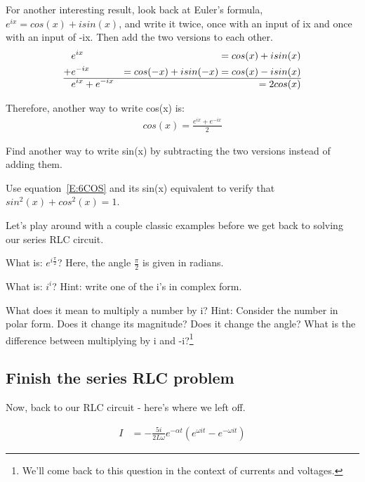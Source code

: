 For another interesting result, look back at Euler's formula, $e^{ix}=cos(x)+isin(x)$, and write it twice, once with an input of ix and once with an input of -ix. Then add the two versions to each other.
\begin{align}
&e^{ix}&=cos(x)+isin(x) \notag\\
+&e^{-ix}&=cos(-x)+isin(-x)=cos(x)-isin(x) \notag\\
\hline
&e^{ix}+e^{-ix}&=2cos(x)
\end{align}

Therefore, another way to write cos(x) is:
\begin{align}
cos(x)=\frac{e^{ix}+e^{-ix}}{2} \label{E:6COS}
\end{align}

\begin{clevel}
Find another way to write sin(x) by subtracting the two versions instead of adding them.
\end{clevel}

\begin{clevel}
Use equation~\eqref{E:6COS} and its sin(x) equivalent to verify that $sin^2(x)+cos^2(x)=1$.
\end{clevel}


Let's play around with a couple classic examples before we get back to solving our series RLC circuit.

\begin{blevel}
What is: $e^{i\frac{\pi}{2}}$? Here, the angle $\frac{\pi}{2}$ is given in radians.
\end{blevel}

\begin{blevel}
What is: $i^i$? Hint: write one of the i's in complex form. 
\end{blevel}

\begin{clevel}
What does it mean to multiply a number by i? Hint: Consider the number in polar form. Does it change its magnitude? Does it change the angle? What is the difference between multiplying by i and -i?\footnote{We'll come back to this question in the context of currents and voltages.}
\end{clevel}

\subsection{Finish the series RLC problem}
Now, back to our RLC circuit - here's where we left off.

\begin{align}
I&=-\frac{5i}{2L\omega}e^{-\alpha t}(e^{\omega it}-e^{-\omega it})
\end{align} 

